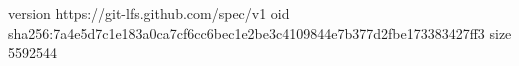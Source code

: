 version https://git-lfs.github.com/spec/v1
oid sha256:7a4e5d7c1e183a0ca7cf6cc6bec1e2be3c4109844e7b377d2fbe173383427ff3
size 5592544

